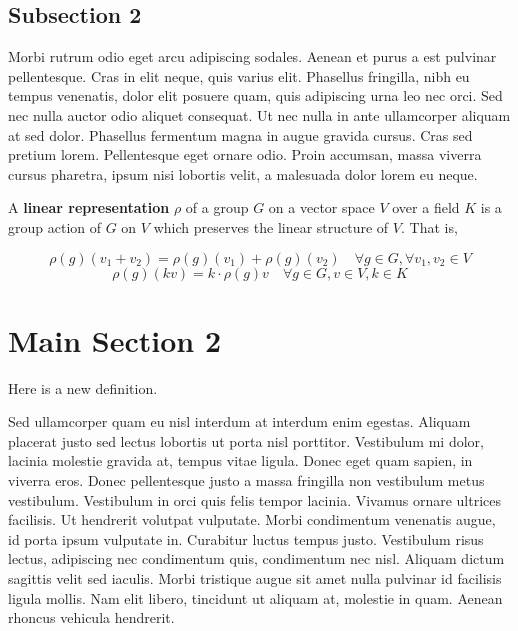 
\subsection{Subsection 2}
Morbi rutrum odio eget arcu adipiscing sodales. Aenean et purus a est pulvinar pellentesque. Cras in elit neque, quis varius elit. Phasellus fringilla, nibh eu tempus venenatis, dolor elit posuere quam, quis adipiscing urna leo nec orci. Sed nec nulla auctor odio aliquet consequat. Ut nec nulla in ante ullamcorper aliquam at sed dolor. Phasellus fermentum magna in augue gravida cursus. Cras sed pretium lorem. Pellentesque eget ornare odio. Proin accumsan, massa viverra cursus pharetra, ipsum nisi lobortis velit, a malesuada dolor lorem eu neque.


\begin{defn}A \textbf{linear representation} $\rho$ of a group $G$ on a vector space $V$ over a field $K$ is a group action of $G$ on $V$ which preserves the linear structure of $V$.  That is, 


\begin{equation} \rho(g)(v_1+v_2)=\rho(g)(v_1)+\rho(g)(v_2) \quad  \forall g \in G, \forall v_1, v_2 \in V \end{equation}
 \[\rho(g)(kv) = k \cdot \rho(g)v \quad \forall g \in G, v \in V, k \in K \]

 \end{defn}

\section{Main Section 2}


\begin{defn}Here is a new definition.\end{defn}

Sed ullamcorper quam eu nisl interdum at interdum enim egestas. Aliquam placerat justo sed lectus lobortis ut porta nisl porttitor. Vestibulum mi dolor, lacinia molestie gravida at, tempus vitae ligula. Donec eget quam sapien, in viverra eros. Donec pellentesque justo a massa fringilla non vestibulum metus vestibulum. Vestibulum in orci quis felis tempor lacinia. Vivamus ornare ultrices facilisis. Ut hendrerit volutpat vulputate. Morbi condimentum venenatis augue, id porta ipsum vulputate in. Curabitur luctus tempus justo. Vestibulum risus lectus, adipiscing nec condimentum quis, condimentum nec nisl. Aliquam dictum sagittis velit sed iaculis. Morbi tristique augue sit amet nulla pulvinar id facilisis ligula mollis. Nam elit libero, tincidunt ut aliquam at, molestie in quam. Aenean rhoncus vehicula hendrerit.